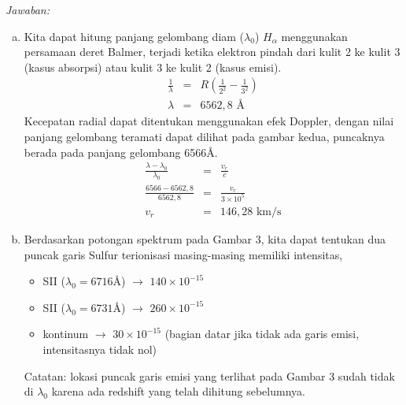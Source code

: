 \documentclass[11pt,fleqn]{exam}
\begin{document}
\begin{questions}
\newpage
\textit{Jawaban:}
\begin{enumerate}[a.]
    \item Kita dapat hitung panjang gelombang diam ($\lambda_0$) $H_\alpha$ menggunakan persamaan deret Balmer, terjadi ketika elektron pindah dari kulit 2 ke kulit 3 (kasus absorpsi) atau kulit 3 ke kulit 2 (kasus emisi).
    \begin{eqnarray*}
        \frac{1}{\lambda} &=& R \left( \frac{1}{2^2} - \frac{1}{3^2} \right)\\
        \lambda &=& 6562,8 \text{ \AA}
    \end{eqnarray*}
    Kecepatan radial dapat ditentukan menggunakan efek Doppler, dengan nilai panjang gelombang teramati dapat dilihat pada gambar kedua, puncaknya berada pada panjang gelombang 6566\AA.
    \begin{eqnarray*}
        \frac{\lambda - \lambda_0}{\lambda_0} &=& \frac{v_r}{c}\\
        \frac{6566 - 6562,8}{6562,8} &=& \frac{v_r}{3 \times 10^5}\\
        v_r &=& 146,28 \text{ km/s} 
    \end{eqnarray*}
    
    \item Berdasarkan potongan spektrum pada Gambar 3, kita dapat tentukan dua puncak garis Sulfur terionisasi masing-masing memiliki intensitas, 
    \begin{itemize}
        \item SII ($\lambda_0 = 6716$\AA) $\rightarrow$ $140 \times 10^{-15}$
        \item SII ($\lambda_0 = 6731$\AA) $\rightarrow$ $260 \times 10^{-15}$
        \item kontinum $\rightarrow$ $30 \times 10^{-15}$ (bagian datar jika tidak ada garis emisi, intensitasnya tidak nol)
    \end{itemize}
    Catatan: lokasi puncak garis emisi yang terlihat pada Gambar 3 sudah tidak di $\lambda_0$ karena ada redshift yang telah dihitung sebelumnya.


\end{enumerate}
\end{questions}
\end{document}

